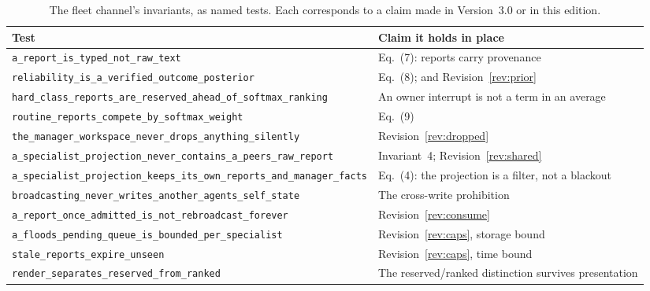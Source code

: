 \documentclass[11pt]{article}
\newcommand{\tcode}[1]{\texttt{\scriptsize #1}}
\begin{document}
\begin{table}[h]
\centering\small
\caption{The fleet channel's invariants, as named tests. Each corresponds to a claim made in Version~3.0 or in this edition.}
\label{tab:tests}
\begin{tabular}{@{}L{9.0cm}L{4.9cm}@{}}
\toprule
\textbf{Test} & \textbf{Claim it holds in place} \\
\midrule
\tcode{a\_\allowbreak{}report\_\allowbreak{}is\_\allowbreak{}typed\_\allowbreak{}not\_\allowbreak{}raw\_\allowbreak{}text} & Eq.~(7): reports carry provenance \\
\tcode{reliability\_\allowbreak{}is\_\allowbreak{}a\_\allowbreak{}verified\_\allowbreak{}outcome\_\allowbreak{}posterior} & Eq.~(8); and Revision~\ref{rev:prior} \\
\tcode{hard\_\allowbreak{}class\_\allowbreak{}reports\_\allowbreak{}are\_\allowbreak{}reserved\_\allowbreak{}ahead\_\allowbreak{}of\_\allowbreak{}softmax\_\allowbreak{}ranking} & An owner interrupt is not a term in an average \\
\tcode{routine\_\allowbreak{}reports\_\allowbreak{}compete\_\allowbreak{}by\_\allowbreak{}softmax\_\allowbreak{}weight} & Eq.~(9) \\
\tcode{the\_\allowbreak{}manager\_\allowbreak{}workspace\_\allowbreak{}never\_\allowbreak{}drops\_\allowbreak{}anything\_\allowbreak{}silently} & Revision~\ref{rev:dropped} \\
\tcode{a\_\allowbreak{}specialist\_\allowbreak{}projection\_\allowbreak{}never\_\allowbreak{}contains\_\allowbreak{}a\_\allowbreak{}peers\_\allowbreak{}raw\_\allowbreak{}report} & Invariant~4; Revision~\ref{rev:shared} \\
\tcode{a\_\allowbreak{}specialist\_\allowbreak{}projection\_\allowbreak{}keeps\_\allowbreak{}its\_\allowbreak{}own\_\allowbreak{}reports\_\allowbreak{}and\_\allowbreak{}manager\_\allowbreak{}facts} & Eq.~(4): the projection is a filter, not a blackout \\
\tcode{broadcasting\_\allowbreak{}never\_\allowbreak{}writes\_\allowbreak{}another\_\allowbreak{}agents\_\allowbreak{}self\_\allowbreak{}state} & The cross-write prohibition \\
\tcode{a\_\allowbreak{}report\_\allowbreak{}once\_\allowbreak{}admitted\_\allowbreak{}is\_\allowbreak{}not\_\allowbreak{}rebroadcast\_\allowbreak{}forever} & Revision~\ref{rev:consume} \\
\tcode{a\_\allowbreak{}floods\_\allowbreak{}pending\_\allowbreak{}queue\_\allowbreak{}is\_\allowbreak{}bounded\_\allowbreak{}per\_\allowbreak{}specialist} & Revision~\ref{rev:caps}, storage bound \\
\tcode{stale\_\allowbreak{}reports\_\allowbreak{}expire\_\allowbreak{}unseen} & Revision~\ref{rev:caps}, time bound \\
\tcode{render\_\allowbreak{}separates\_\allowbreak{}reserved\_\allowbreak{}from\_\allowbreak{}ranked} & The reserved/ranked distinction survives presentation \\
\bottomrule
\end{tabular}
\end{table}
\end{document}
